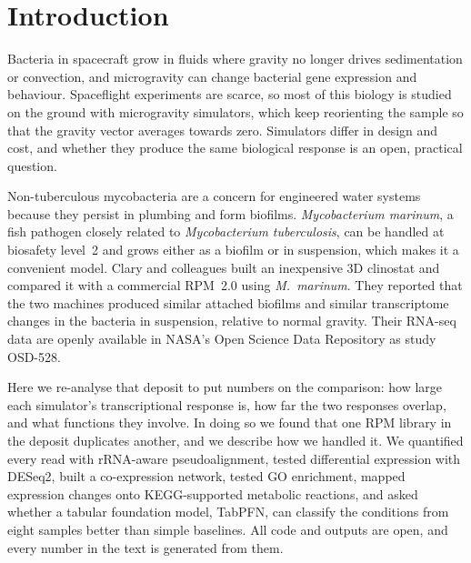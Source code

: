 \section*{Introduction}

Bacteria in spacecraft grow in fluids where gravity no longer drives sedimentation or convection, and microgravity can change bacterial gene expression and behaviour\cite{nickerson2000microgravity}. Spaceflight experiments are scarce, so most of this biology is studied on the ground with microgravity simulators, which keep reorienting the sample so that the gravity vector averages towards zero. Simulators differ in design and cost, and whether they produce the same biological response is an open, practical question.

Non-tuberculous mycobacteria are a concern for engineered water systems because they persist in plumbing and form biofilms\cite{falkinham2015common}. \textit{Mycobacterium marinum}, a fish pathogen closely related to \textit{Mycobacterium tuberculosis}\cite{stinear2008insights}, can be handled at biosafety level~2 and grows either as a biofilm or in suspension, which makes it a convenient model\cite{clary2022development,osd528data}. Clary and colleagues built an inexpensive 3D clinostat and compared it with a commercial RPM~2.0 using \textit{M.~marinum}\cite{clary2022development}. They reported that the two machines produced similar attached biofilms and similar transcriptome changes in the bacteria in suspension, relative to normal gravity. Their RNA-seq data are openly available in NASA's Open Science Data Repository as study OSD-528\cite{osd528data}.

Here we re-analyse that deposit to put numbers on the comparison: how large each simulator's transcriptional response is, how far the two responses overlap, and what functions they involve. In doing so we found that one RPM library in the deposit duplicates another, and we describe how we handled it. We quantified every read with rRNA-aware pseudoalignment, tested differential expression with DESeq2, built a co-expression network, tested GO enrichment, mapped expression changes onto KEGG-supported metabolic reactions, and asked whether a tabular foundation model, TabPFN\cite{hollmann2025accurate}, can classify the conditions from eight samples better than simple baselines. All code and outputs are open, and every number in the text is generated from them\cite{wilkinson2016fair}.
